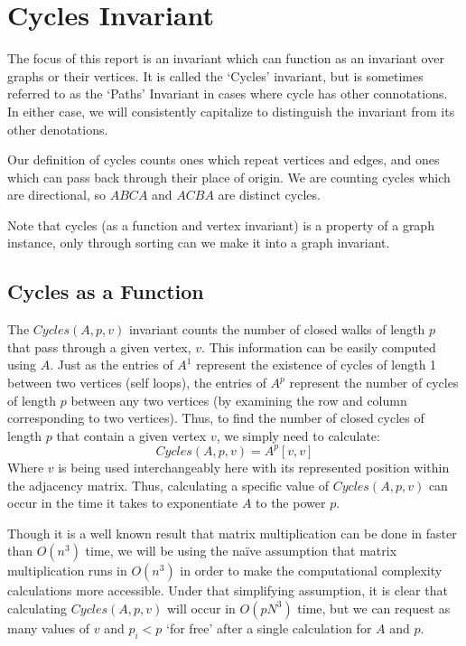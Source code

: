 \section{Cycles Invariant}
The focus of this report is an invariant which can function as an invariant over graphs or their vertices.
It is called the `Cycles' invariant, but is sometimes referred to as the `Paths' Invariant in cases where cycle has other connotations.
In either case, we will consistently capitalize to distinguish the invariant from its other denotations.

Our definition of cycles counts ones which repeat vertices and edges, and ones which can pass back through their place of origin.
We are counting cycles which are directional, so $ABCA$ and $ACBA$ are distinct cycles.

Note that cycles (as a function and vertex invariant) is a property of a graph instance, only through sorting can we make it into a graph invariant.


\subsection{Cycles as a Function}

The $Cycles(A, p, v)$ invariant counts the number of closed walks of length $p$ that pass through a given vertex, $v$. 
This information can be easily computed using $A$. 
Just as the entries of $A^1$ represent the existence of cycles of length 1 between two vertices (self loops), the entries of $A^p$ represent the number of cycles of length $p$ between any two vertices (by examining the row and column corresponding to two vertices).
Thus, to find the number of closed cycles of length $p$ that contain a given vertex $v$, we simply need to calculate: 
$$Cycles(A, p, v) = A^p[v, v]$$
Where $v$ is being used interchangeably here with its represented position within the adjacency matrix. 
Thus, calculating a specific value of $Cycles(A, p, v)$ can occur in the time it takes to exponentiate $A$ to the power $p$.

Though it is a well known result that matrix multiplication can be done in faster than $O(n^3)$ time, we will be using the na\"{i}ve assumption that matrix multiplication runs in $O(n^3)$ in order to make the computational complexity calculations more accessible.  
Under that simplifying assumption, it is clear that calculating $Cycles(A, p, v)$ will occur in $O(p N^3)$ time, but we can request as many values of $v$ and $p_i < p$ `for free' after a single calculation for $A$ and $p$.


